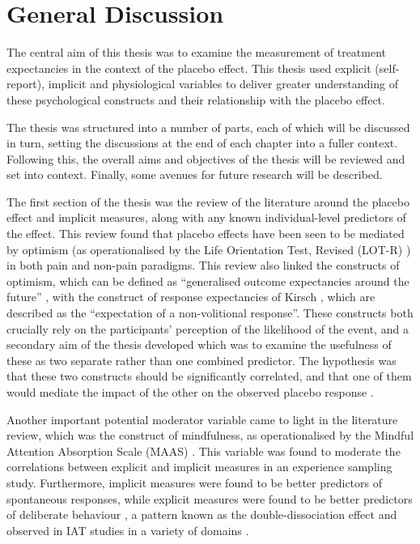

\section{General Discussion}

The central aim of this thesis was to examine the measurement of treatment
expectancies in the context of the placebo effect. This thesis used explicit (self-report), implicit and physiological variables to deliver greater understanding of these psychological constructs and their relationship with the placebo effect.


The thesis was structured into a number of parts, each of which will be discussed in turn, setting the discussions at the end of each chapter into a fuller context. Following this, the overall aims and objectives of the thesis will be reviewed and set into context. Finally, some avenues for future research will be described. 

The first section of the thesis was the review of the literature around the placebo effect and implicit measures, along with any known individual-level predictors of the effect. This review found that placebo effects have been seen to be mediated by optimism (as operationalised by the Life Orientation Test, Revised (LOT-R) \cite{Scheier1994}) \cite{Geers2005,morton2009reproducibility} in both pain and non-pain paradigms. This review also linked the constructs of optimism, which can be defined as ``generalised outcome expectancies around the future'' \cite{Carver2010}, with the construct of response expectancies of Kirsch \cite{Kirsch1985,Kirsch1997}, which are described as the ``expectation of a non-volitional response''. These constructs both crucially rely on the participants' perception of the likelihood of the event, and a secondary aim of the thesis developed which was to examine the usefulness of these as two separate rather than one combined predictor. The hypothesis was that these two constructs should be significantly correlated, and that one of them would mediate the impact of the other on the observed placebo response \cite{Geers2005}. 

Another important potential moderator variable came to light in the literature review, which was the construct of mindfulness, as operationalised by the Mindful Attention Absorption Scale (MAAS) \cite{brown2003benefits}. This variable was found to moderate the correlations between explicit and implicit measures in an experience sampling study. Furthermore, implicit measures were found to be better predictors of spontaneous responses, while explicit measures were found to be better predictors of deliberate behaviour \cite{Levesque2007}, a pattern known as the double-dissociation effect and observed in IAT studies in a variety of domains \cite{Asendorpf2002,Perugini2005,Grumm2007,Steffens2006}. 

